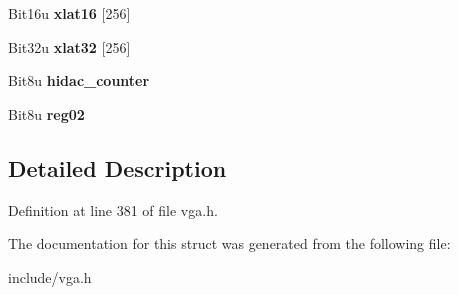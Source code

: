 \begin{DoxyCompactItemize}
\item 
\hypertarget{structVGA__Dac_a0ecbd2205771f2bd6eeda1e799f17597}{Bit16u {\bfseries xlat16} \mbox{[}256\mbox{]}}\label{structVGA__Dac_a0ecbd2205771f2bd6eeda1e799f17597}

\item 
\hypertarget{structVGA__Dac_a9bd0942c9ea49acc3d4055ffd6115901}{Bit32u {\bfseries xlat32} \mbox{[}256\mbox{]}}\label{structVGA__Dac_a9bd0942c9ea49acc3d4055ffd6115901}

\item 
\hypertarget{structVGA__Dac_acb8aaed4d1da7f09f5875bc6d4907721}{Bit8u {\bfseries hidac\-\_\-counter}}\label{structVGA__Dac_acb8aaed4d1da7f09f5875bc6d4907721}

\item 
\hypertarget{structVGA__Dac_a5d62487fbce7e19eaeb97eb8685dd301}{Bit8u {\bfseries reg02}}\label{structVGA__Dac_a5d62487fbce7e19eaeb97eb8685dd301}

\end{DoxyCompactItemize}


\subsection{Detailed Description}


Definition at line 381 of file vga.\-h.



The documentation for this struct was generated from the following file\-:\begin{DoxyCompactItemize}
\item 
include/vga.\-h\end{DoxyCompactItemize}
